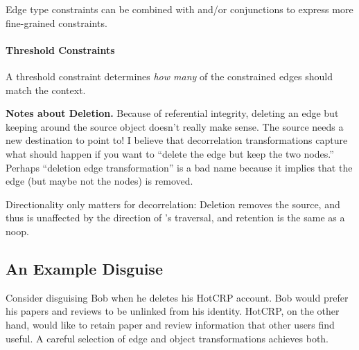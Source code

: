 Edge type constraints can be combined with and/or conjunctions to express more fine-grained
constraints.  

\paragraph{Threshold Constraints}
         A threshold constraint determines \emph{how many} of the constrained edges should match the context.


\vspace{0.5\baselineskip}\noindent\textbf{Notes about Deletion.}
    Because of referential integrity, deleting an edge but keeping around the source object
    doesn't really make sense. The source needs a new destination to point to! I believe that
    decorrelation transformations capture what should happen if you want to ``delete the edge
    but keep the two nodes.'' Perhaps ``deletion edge transformation'' is a bad name because it
    implies that the edge (but maybe not the nodes) is removed.

    Directionality only matters for decorrelation: Deletion removes the source, and thus is unaffected by
    the direction of \sys's traversal, and retention is the same as a noop.

\subsection{An Example Disguise}
\label{design:eg}
%
Consider disguising Bob when he deletes his HotCRP account.
%
Bob would prefer his papers and reviews to be unlinked from his identity.
%
HotCRP, on the other hand, would like to retain paper and review information that other users
find useful.
%
A careful selection of edge and object transformations achieves both.
%

